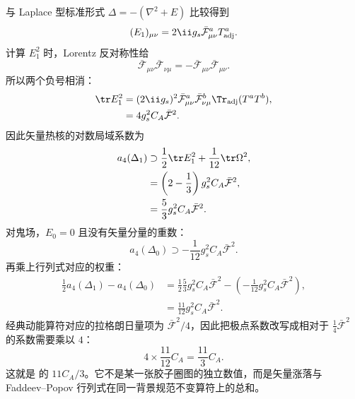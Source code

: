 \begin{derivation}
与 Laplace 型标准形式 $\Delta=-(\nabla^2+E)$ 比较得到
\begin{equation*}
 (E_1)_{\mu\nu}
 =2\ii g_s\bar{\mathcal F}_{\mu\nu}^aT_{\rm adj}^a.
\end{equation*}
计算 $E_1^2$ 时，Lorentz 反对称性给
\begin{equation*}
 \bar{\mathcal F}_{\mu\nu}\bar{\mathcal F}_{\nu\mu}
 =-\bar{\mathcal F}_{\mu\nu}\bar{\mathcal F}_{\mu\nu}.
\end{equation*}
所以两个负号相消：
\begin{align*}
 \tr E_1^2
 &=(2\ii g_s)^2
 \bar{\mathcal F}_{\mu\nu}^a\bar{\mathcal F}_{\nu\mu}^b
 \Tr_{\rm adj}(T^aT^b),\\
 &=4g_s^2C_A\bar{\mathcal F}^2.
\end{align*}
因此矢量热核的对数局域系数为
\begin{align*}
 a_4(\Delta_1)
 &\supset
 \frac12\tr E_1^2+\frac1{12}\tr\Omega^2,\\
 &=\left(2-\frac13\right)g_s^2C_A\bar{\mathcal F}^2,\\
 &=\frac53g_s^2C_A\bar{\mathcal F}^2.
\end{align*}
对鬼场，$E_0=0$ 且没有矢量分量的重数：
\begin{equation*}
 a_4(\Delta_0)
 \supset-\frac1{12}g_s^2C_A\bar{\mathcal F}^2.
\end{equation*}
再乘上行列式对应的权重：
\begin{align*}
 \frac12a_4(\Delta_1)-a_4(\Delta_0)
 &=\frac12\frac53g_s^2C_A\bar{\mathcal F}^2
 -\left(-\frac1{12}g_s^2C_A\bar{\mathcal F}^2\right),\\
 &=\frac{11}{12}g_s^2C_A\bar{\mathcal F}^2.
\end{align*}
经典动能算符对应的拉格朗日量项为 $\bar{\mathcal F}^2/4$，因此把极点系数改写成相对于 $\frac14\bar{\mathcal F}^2$ 的系数需要乘以 $4$：
\begin{equation*}
 {4\times\frac{11}{12}C_A=\frac{11}{3}C_A.}
\end{equation*}
这就是  的 $11C_A/3$。它不是某一张胶子圈图的独立数值，而是矢量涨落与 Faddeev--Popov 行列式在同一背景规范不变算符上的总和。
\end{derivation}

